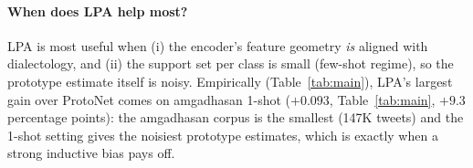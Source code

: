 \paragraph{When does LPA help most?}
LPA is most useful when (i) the encoder's feature geometry
\emph{is} aligned with dialectology, and (ii) the support set
per class is small (few-shot regime), so the prototype estimate
itself is noisy. Empirically (Table~\ref{tab:main}), LPA's
largest gain over ProtoNet comes on amgadhasan 1-shot
($+0.093$, Table~\ref{tab:main}, $+9.3$ percentage points):
the amgadhasan corpus is the smallest (147K tweets) and the
1-shot setting gives the noisiest prototype estimates, which
is exactly when a strong inductive bias pays off.